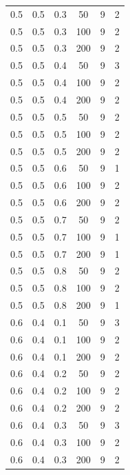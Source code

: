 \documentclass[a4paper,14pt, unknownkeysallowed]{extreport}
\begin{document}
\begin{center}
\begin{longtable}[c]{|c|c|c|c|c|c|}
        \hline
         0.5 &  0.5 &  0.3 &   50 &     9 &     2 \\
         0.5 &  0.5 &  0.3 &  100 &     9 &     2 \\
         0.5 &  0.5 &  0.3 &  200 &     9 &     2 \\
        \hline
         0.5 &  0.5 &  0.4 &   50 &     9 &     3 \\
         0.5 &  0.5 &  0.4 &  100 &     9 &     2 \\
         0.5 &  0.5 &  0.4 &  200 &     9 &     2 \\
        \hline
         0.5 &  0.5 &  0.5 &   50 &     9 &     2 \\
         0.5 &  0.5 &  0.5 &  100 &     9 &     2 \\
         0.5 &  0.5 &  0.5 &  200 &     9 &     2 \\
        \hline
         0.5 &  0.5 &  0.6 &   50 &     9 &     1 \\
         0.5 &  0.5 &  0.6 &  100 &     9 &     2 \\
         0.5 &  0.5 &  0.6 &  200 &     9 &     2 \\
        \hline
         0.5 &  0.5 &  0.7 &   50 &     9 &     2 \\
         0.5 &  0.5 &  0.7 &  100 &     9 &     1 \\
         0.5 &  0.5 &  0.7 &  200 &     9 &     1 \\
        \hline
         0.5 &  0.5 &  0.8 &   50 &     9 &     2 \\
         0.5 &  0.5 &  0.8 &  100 &     9 &     2 \\
         0.5 &  0.5 &  0.8 &  200 &     9 &     1 \\
        \hline
         0.6 &  0.4 &  0.1 &   50 &     9 &     3 \\
         0.6 &  0.4 &  0.1 &  100 &     9 &     2 \\
         0.6 &  0.4 &  0.1 &  200 &     9 &     2 \\
        \hline
         0.6 &  0.4 &  0.2 &   50 &     9 &     2 \\
         0.6 &  0.4 &  0.2 &  100 &     9 &     2 \\
         0.6 &  0.4 &  0.2 &  200 &     9 &     2 \\
        \hline
         0.6 &  0.4 &  0.3 &   50 &     9 &     3 \\
         0.6 &  0.4 &  0.3 &  100 &     9 &     2 \\
         0.6 &  0.4 &  0.3 &  200 &     9 &     2 \\

\end{longtable}
\end{center}
\end{document}
